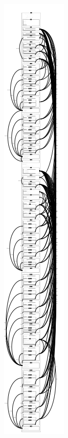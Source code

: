 \begin{center}
\noindent \includegraphics[scale=0.8]{Figures/appendix/steamboiler/zdraoutput.png}
\end{center}

